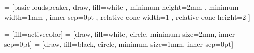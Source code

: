 
 = [basic loudspeaker, draw, fill=white
, minimum height=2mm 	    %
, minimum width=1mm		    %
, inner sep=0pt
, relative cone width=1	%
, relative cone height=2	    %
]

 = [fill=activecolor]
 = [draw, fill=white, circle, minimum size=2mm, inner sep=0pt]
 = [draw, fill=black, circle, minimum size=1mm, inner sep=0pt]


